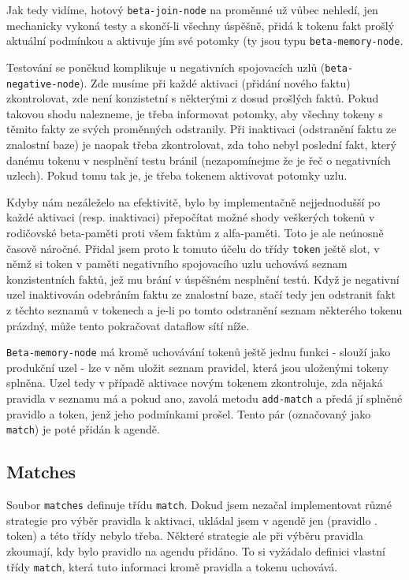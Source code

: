 Jak tedy vidíme, hotový \verb|beta-join-node| na proměnné už vůbec nehledí,
jen mechanicky vykoná testy a skončí-li všechny úspěšně, přidá k tokenu
fakt prošlý aktuální podmínkou a aktivuje jím své potomky (ty jsou typu
\verb|beta-memory-node|.

Testování se poněkud komplikuje u negativních spojovacích uzlů
(\verb|beta-negative-node|). Zde musíme při každé aktivaci (přidání nového
faktu) zkontrolovat, zde není konzistetní s některými z dosud prošlých faktů.
Pokud takovou shodu nalezneme, je třeba informovat potomky, aby všechny
tokeny s těmito fakty ze svých proměnných odstranily. Při inaktivaci
(odstranění faktu ze znalostní baze) je naopak třeba zkontrolovat, zda toho
nebyl poslední fakt, který danému tokenu v nesplnění testu bránil (nezapomínejme
že je řeč o negativních uzlech). Pokud tomu tak je, je třeba tokenem aktivovat
potomky uzlu.

Kdyby nám nezáleželo na efektivitě, bylo by implementačně nejjednodušší po
každé aktivaci (resp. inaktivaci) přepočítat možné shody veškerých tokenů
v rodičovské beta-paměti proti všem faktům z alfa-paměti. Toto je ale
neúnosně časově náročné. Přidal jsem proto k tomuto účelu do třídy \verb|token|
ještě slot, v němž si token v paměti negativního spojovacího uzlu uchovává
seznam konzistentních faktů, jež mu brání v úspěšném nesplnění testů. Když
je negativní uzel inaktivován odebráním faktu ze znalostní baze, stačí tedy
jen odstranit fakt z těchto seznamů v tokenech a je-li po tomto odstranění
seznam některého tokenu prázdný, může tento pokračovat dataflow sítí níže.

\verb|Beta-memory-node| má kromě uchovávání tokenů ještě jednu funkci -
slouží jako produkční uzel - lze v něm uložit seznam pravidel, která jsou
uloženými tokeny splněna. Uzel tedy v případě aktivace novým tokenem
zkontroluje, zda nějaká pravidla v seznamu má a pokud ano, zavolá metodu
\verb|add-match| a předá jí splněné pravidlo a token, jenž jeho podmínkami
prošel. Tento pár (označovaný jako \verb|match|) je poté přidán k agendě.
\subsection{Matches}
Soubor \verb|matches| definuje třídu \verb|match|. Dokud jsem nezačal
implementovat různé strategie pro výběr pravidla k aktivaci, ukládal jsem v
agendě jen (pravidlo . token) a této třídy nebylo třeba. Některé strategie ale
při výběru pravidla zkoumají, kdy bylo pravidlo na agendu přidáno. To si
vyžádalo definici vlastní třídy \verb|match|, která tuto informaci kromě
pravidla a tokenu uchovává.
